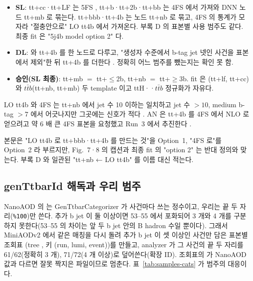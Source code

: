 \begin{itemize}
  \item \textbf{SL}: tt+cc·tt+LF 는 5FS \ttbar, tt+b·tt+2b·tt+bb 는 4FS \ttbb 에서 가져와 DNN 노드 tt+mb 로 묶는다. tt+bbb·tt+4b 는
        노드 tt+nb 로 묶고, 4FS 의 통계가 모자라 "절충안으로" LO tt4b 에서 가져온다. 부록 D 의 표본별 사용 범주도
        같다. 최종 fit 은 "5j4b model option 2" 다.
  \item \textbf{DL}: \ttbar 와 tt+4b 를 한 노드로 다루고, "생성자 수준에서 b-tag jet 넷인 사건을 \ttbar 표본에서 제외"한 뒤 tt+4b 를 더한다
        . 정확히 어느 범주를 뺐는지는 확인 못 함.
  \item \textbf{승인(SL 최종)}: tt+mb $=$ tt+$\leq$2b, tt+nb $=$ tt+$\geq$3b. fit 은 \ttbar(tt+lf, tt+cc)와 $t\bar tb$(tt+nb, tt+mb) 두 template 이고
        ttH·\ttbar·$t\bar tb$ 정규화가 자유다.
\end{itemize}
LO tt4b 와 4FS \ttbb 는 tt+nb 에서 jet 수 10 이하는 일치하고 jet 수 $>10$, medium b-tag $>7$ 에서 어긋나지만 그곳에는 신호가 적다
. AN 은 tt+4b 를 4FS 에서 NLO 로 얻으려고 약 6 배 큰 4FS 표본을 요청했고 Run~3 에서 추진한다
.

\begin{andiff}
본문은 "LO tt4b 로 tt+bbb·tt+4b 를 만드는 것"을 Option~1, "4FS \ttbb 로"를 Option~2 라 부르지만, Fig.~7·8 의 캡션과 최종 fit 의
"option 2" 는 반대 정의와 맞는다. 부록 D 와 일관된 "tt+nb ← LO tt4b" 를 이름 대신 적는다.
\end{andiff}

\subsection{genTtbarId 해독과 우리 범주}\label{sec:samples-genttbarid}

NanoAOD 의  는 GenTtbarCategorizer 가 사건마다 쓰는 정수이고, 우리는 끝 두 자리(\texttt{\%100})만 쓴다. 추가 b jet
이 둘 이상이면 53--55 에서 포화되어 3 개와 4 개를 구분하지 못한다(53--55 의 차이는 앞 두 b jet 안의 B hadron 수일 뿐이다). 그래서
MiniAODv2 에서 같은 매칭을 다시 돌려 추가 b jet 이 셋 이상인 사건만 담은 표본별 조회표 (tree , 키 (run, lumi, event))를 만들고,
analyzer 가 그 사건의 끝 두 자리를 61/62(정확히 3 개), 71/72(4 개 이상)로 덮어쓴다(확장 ID). 조회표의
 가 NanoAOD 값과 다르면 잘못 짝지은 파일이므로 멈춘다. 표~\ref{tab:samples-cats} 가 범주의 대응이다.

